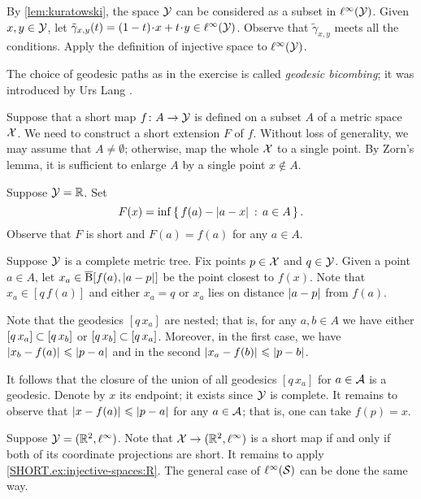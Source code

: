 By \ref{lem:kuratowski}, the space $\mathcal{Y}$ can be considered as a subset in $\ell^\infty(\mathcal{Y})$.
Given $x,y\in \mathcal{Y}$, let $\tilde\gamma_{x,y}(t)=(1-t)\cdot x+t\cdot y\in \ell^\infty(\spc{Y})$.
Observe that $\tilde\gamma_{x,y}$ meets all the conditions.
Apply the definition of injective space to $\ell^\infty(\mathcal{Y})$.

 The choice of geodesic paths as in the exercise is called \emph{geodesic bicombing}; it was introduced by Urs Lang \cite[3.6]{lang-2013}.

Suppose that a short map $f\colon A\to\mathcal{Y}$ is defined on a subset $A$ of a metric space $\mathcal{X}$.
We need to construct a short extension $F$ of $f$.
Without loss of generality, we may assume that $A\ne\emptyset$;
otherwise, map the whole $\mathcal{X}$ to a single point.
By Zorn's lemma, it is sufficient to enlarge $A$ by a single point $x\notin A$.

Suppose $\mathcal{Y}=\mathbb{R}$.
Set 
\[F(x)=\inf\set{f(a)-\dist{a}{x}{}}{a\in A}.\] 
Observe that $F$ is short and $F(a)=f(a)$ for any $a\in A$.

Suppose  $\mathcal{Y}$ is a complete metric tree.
Fix points $p\in \mathcal{X}$ and $q\in\mathcal{Y}$.
Given a point $a\in A$,
let $x_a\in\cBall[f(a),\dist{a}{p}{}]$ be the point closest to $f(x)$.
Note that $x_a\in[q\,f(a)]$ and either $x_a=q$ or $x_a$ lies on distance $\dist{a}{p}{}$ from $f(a)$.

Note that the geodesics $[q\,x_a]$ are nested;
that is, for any $a,b\in A$ we have either $[q\,x_a]\z\subset [q\,x_b]$ or $[q\,x_b]\z\subset [q\,x_a]$.
Moreover, in the first case, we have $\dist{x_b}{f(a)}{}\le \dist{p}{a}{}$ and in the second $\dist{x_a}{f(b)}{}\le \dist{p}{b}{}$.

It follows that the closure of the union of all geodesics $[q\,x_a]$ for $a\in\mathcal{A}$ is a geodesic.
Denote by $x$ its endpoint; it exists since $\mathcal{Y}$ is complete.
It remains to observe that $\dist{x}{f(a)}{}\le \dist{p}{a}{}$ for any $a\in\mathcal{A}$;
that is, one can take $f(p)=x$.

Suppose $\mathcal{Y}=(\mathbb{R}^2,\ell^\infty)$.
Note that $\spc{X}\z\to (\RR^2,\ell^\infty)$ is a short map if and only if both of its coordinate projections are short.
It remains to apply \ref{SHORT.ex:injective-spaces:R}.
The general case of $\ell^\infty(\mathcal{S})$ can be done the same way.

